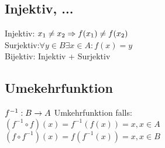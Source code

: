 \subsection*{Injektiv, ...}
 Injektiv: $x_1 \neq x_2 \Rightarrow f(x_1) \neq f(x_2)$\\
 Surjektiv:$\forall y \in B \exists x \in A: f(x) = y$\\
 Bijektiv: Injektiv + Surjektiv

\subsection*{Umekehrfunktion}
$f^{-1}: B \rightarrow A$ Umkehrfunktion falls:\\
    $(f^{-1} \circ f) (x) = f^{-1}(f(x)) = x, x \in A$\\
    $(f \circ f^{-1})(x) = f(f^{-1}(x)) = x, x \in B$
